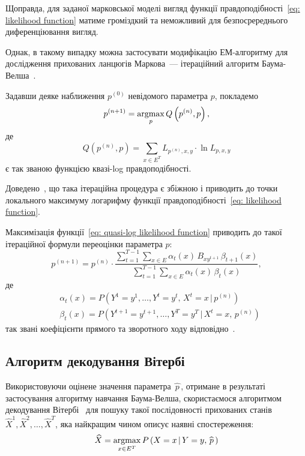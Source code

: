 Щоправда, для заданої марковської моделі вигляд функції правдоподібності~\eqref{eq: likelihood function} матиме громіздкий та неможливий для безпосререднього диференціювання вигляд. 

Однак, в такому випадку можна застосувати модифікацію ЕМ-алгоритму для дослідження прихованих ланцюгів Маркова~--- ітераційний алгоритм Баума-Велша~\cite[розділ 15]{Koski2001}. 

Задавши деяке наближення $p^{(0)}$ невідомого параметра $p$, покладемо
\begin{equation*}\label{eq: p MQL estomation}
    p^{(n+1)} = \operatorname*{argmax}\limits_{p} Q\left( p^{(n)},p \right),
\end{equation*}
де
\begin{equation}\label{eq: quasi-log likelihood function}
    Q\left( p^{(n)},p \right) = \sum_{x \in E^T}L_{p^{(n)},x,y}\cdot\ln L_{p,x,y}
\end{equation}
є так званою функцією квазі-log правдоподібності.

Доведено~\cite[розділ 4]{Koski2001}, що така ітераційна процедура є збіжною і приводить до точки локального максимуму логарифму функції правдоподібності~\eqref{eq: likelihood function}. 

Максимізація функції~\eqref{eq: quasi-log likelihood function} приводить до такої ітераційної формули переоцінки параметра $p:$
\begin{equation}\label{eq: p baum-welch estimation}
    p^{(n+1)} = p^{(n)}\cdot\frac{\sum\limits_{t=1}^{T-1}\sum\limits_{x \in E} \alpha_t(x)\,B_{xy^{t+1}}\,\beta_{t+1}(x)}{\sum\limits_{t=1}^{T-1}\sum\limits_{x \in E} \alpha_t(x)\,\beta_t(x)},
\end{equation}
де 
\begin{align}
    & \alpha_t(x) = P\left( Y^1=y^1,\ldots,Y^t=y^t,\,X^t=x \,|\, p^{(n)} \right) \label{eq: alpha, forward algorithm coefficients} \\
    & \beta_t(x) = P\left( Y^{t+1}=y^{t+1},\ldots,Y^T=y^T \,|\, X^t=x,\, p^{(n)} \right) \label{eq: beta, backward algorithm coefficients}
\end{align}
так звані коефіцієнти прямого та зворотного ходу відповідно~\cite[розділ 5]{Nilsson2005}. 

\subsection*{Алгоритм декодування Вітербі}

Використовуючи оцінене значення параметра $\widehat{\,p\,}$, отримане в результаті застосування алгоритму навчання Баума-Велша, скористаємося алгоритмом декодування Вітербі~\cite[розділ 6]{Nilsson2005} для пошуку такої послідовності прихованих станів $\widehat{X}^1,\widehat{X}^2,\ldots,\widehat{X}^T$, яка найкращим чином описує наявні спостереження:
\begin{equation*}\label{eq: decoded stated}
    \widehat{X} = \operatorname*{argmax}\limits_{x \in E^T} P\left( X=x\,|\,Y=y,\widehat{\,p\,} \right)
\end{equation*}


